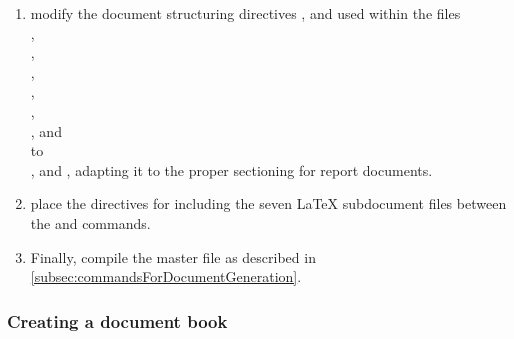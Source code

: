 \begin{enumerate}
\item \label{item:modifyStructuringDirectives}
  modify the document structuring directives \latexcmd{\section},
  \latexcmd{\subsection} and \latexcmd{\subsubsection}
  used within the files \\
  , \\
  , \\
  , \\
  , \\
  , \\
  , and \\
   to \\
  \latexcmd{\chapter}, \latexcmd{\section} and \latexcmd{\subsection},
  adapting it to the proper sectioning for report documents.

\item place the \latexcmd{} directives for including the seven
  \LaTeX{} subdocument files between the \latexcmd{\printglossary} and
  \latexcmd{\appendix} commands.

\item Finally, compile the master file  as described in
  \autoref{subsec:commandsForDocumentGeneration}.
\end{enumerate}



\subsubsection[A \singledoc document book]{Creating a \singledoc document book}
\label{subsubsec:creatingSingleDocumentBook}

